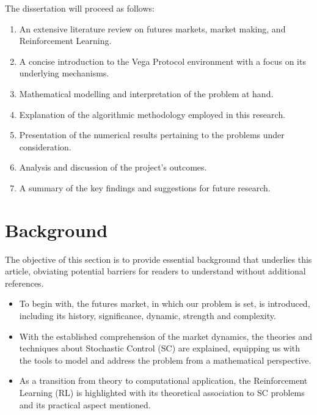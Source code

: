 \documentclass[11pt,twoside]{article}
\numberwithin{Theorem}{section}
\numberwithin{Definition}{section}
\numberwithin{Lemma}{section}
\numberwithin{Algorithm}{section}
\numberwithin{equation}{section}
\begin{document}
The dissertation will proceed as follows:
\begin{enumerate}
\item An extensive literature review on futures markets, market making, and Reinforcement Learning.
\item A concise introduction to the Vega Protocol environment with a focus on its underlying mechanisms.
\item Mathematical modelling and interpretation of the problem at hand.
\item Explanation of the algorithmic methodology employed in this research.
\item Presentation of the numerical results pertaining to the problems under consideration.
\item Analysis and discussion of the project's outcomes.
\item A summary of the key findings and suggestions for future research.
\end{enumerate}

\clearpage

\section{Background}
\label{sec:background}
The objective of this section is to provide essential background that underlies this article, obviating potential barriers for readers to understand without additional references.
\begin{itemize}
\item To begin with, the futures market, in which our problem is set, is introduced, including its history, significance, dynamic, strength and complexity. 
\item With the established comprehension of the market dynamics, the theories and techniques about Stochastic Control (SC) are explained, equipping us with the tools to model and address the problem from a mathematical perspective. 
\item As a transition from theory to computational application, the Reinforcement Learning (RL) is highlighted with its theoretical association to SC problems and its practical aspect mentioned.
\end{itemize}

\clearpage
\end{document}
